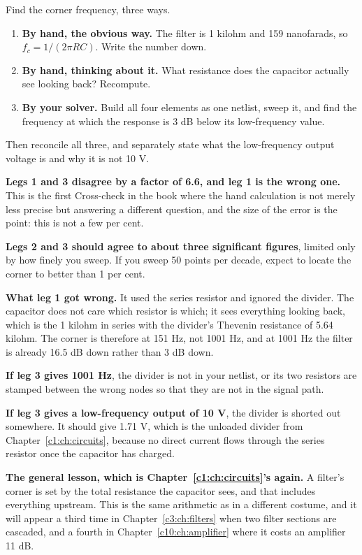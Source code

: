 Find the corner frequency, three ways.

\begin{enumerate}
  \item \textbf{By hand, the obvious way.} The filter is 1 kilohm and 159 nanofarads, so $f_c = 1/(2\pi R C)$. Write the number down.
  \item \textbf{By hand, thinking about it.} What resistance does the capacitor actually see looking back? Recompute.
  \item \textbf{By your solver.} Build all four elements as one netlist, sweep it, and find the frequency at which the response is 3 dB below its low-frequency value.
\end{enumerate}
Then reconcile all three, and separately state what the low-frequency output voltage is and why it is not 10 V.

\textbf{Legs 1 and 3 disagree by a factor of 6.6, and leg 1 is the wrong one.} This is the first Cross-check in the book where the hand calculation is not merely less precise but answering a different question, and the size of the error is the point: this is not a few per cent.

\textbf{Legs 2 and 3 should agree to about three significant figures}, limited only by how finely you sweep. If you sweep 50 points per decade, expect to locate the corner to better than 1 per cent.

\textbf{What leg 1 got wrong.} It used the series resistor and ignored the divider. The capacitor does not care which resistor is which; it sees everything looking back, which is the 1 kilohm in series with the divider's Thevenin resistance of 5.64 kilohm. The corner is therefore at 151 Hz, not 1001 Hz, and at 1001 Hz the filter is already 16.5 dB down rather than 3 dB down.

\textbf{If leg 3 gives 1001 Hz}, the divider is not in your netlist, or its two resistors are stamped between the wrong nodes so that they are not in the signal path.

\textbf{If leg 3 gives a low-frequency output of 10 V}, the divider is shorted out somewhere. It should give 1.71 V, which is the unloaded divider from Chapter~\ref{c1:ch:circuits}, because no direct current flows through the series resistor once the capacitor has charged.

\textbf{The general lesson, which is Chapter~\ref{c1:ch:circuits}'s again.} A filter's corner is set by the total resistance the capacitor sees, and that includes everything upstream. This is the same arithmetic as  in a different costume, and it will appear a third time in Chapter~\ref{c3:ch:filters} when two filter sections are cascaded, and a fourth in Chapter~\ref{c10:ch:amplifier} where it costs an amplifier 11 dB.
